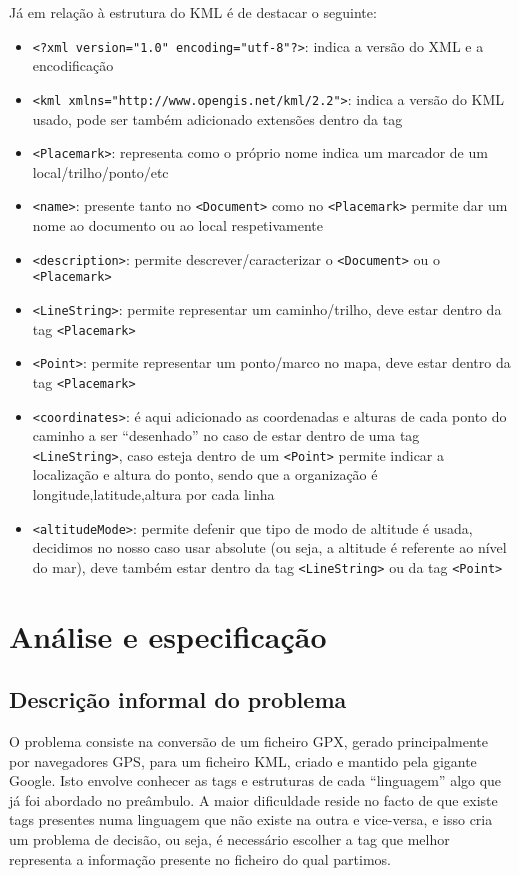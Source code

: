 \documentclass{llncs}
\begin{document}
Já em relação à estrutura do KML é de destacar o seguinte:
\begin{itemize}
    \item \verb|<?xml version="1.0" encoding="utf-8"?>|: indica a versão do XML e a encodificação 
    \item \verb|<kml xmlns="http://www.opengis.net/kml/2.2">|: indica a versão do KML usado, pode ser também adicionado extensões dentro da tag
    \item \verb|<Placemark>|: representa como o próprio nome indica um marcador de um local/trilho/ponto/etc
    \item \verb|<name>|: presente tanto no \verb|<Document>| como no \verb|<Placemark>| permite dar um nome ao documento ou ao local respetivamente
    \item \verb|<description>|: permite descrever/caracterizar o \verb|<Document>| ou o \verb|<Placemark>|
    \item \verb|<LineString>|: permite representar um caminho/trilho, deve estar dentro da tag \verb|<Placemark>|
    \item \verb|<Point>|: permite representar um ponto/marco no mapa, deve estar dentro da tag \verb|<Placemark>|
    \item \verb|<coordinates>|: é aqui adicionado as coordenadas e alturas de cada ponto do caminho a ser ``desenhado'' no caso de estar dentro de uma tag \verb|<LineString>|, caso esteja dentro de um \verb|<Point>| permite indicar a localização e altura do ponto, sendo que a organização é longitude,latitude,altura por cada linha
    \item \verb|<altitudeMode>|: permite defenir que tipo de modo de altitude é usada, decidimos no nosso caso usar absolute (ou seja, a altitude é referente ao nível do mar), deve também estar dentro da tag \verb|<LineString>| ou da tag \verb|<Point>|
\end{itemize}

\section{Análise e especificação}

\subsection{Descrição informal do problema}
O problema consiste na conversão de um ficheiro GPX, gerado principalmente por navegadores GPS, para um ficheiro KML, criado e mantido pela gigante Google. Isto envolve conhecer as tags e estruturas de cada ``linguagem'' algo que já foi abordado no preâmbulo. A maior dificuldade reside no facto de que existe tags presentes numa linguagem que não existe na outra e vice-versa, e isso cria um problema de decisão, ou seja, é necessário escolher a tag que melhor representa a informação presente no ficheiro do qual partimos.
\end{document}
